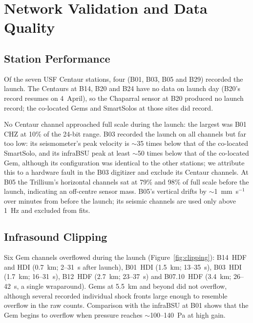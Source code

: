 \documentclass[]{seismica}
\begin{document}
\section{Network Validation and Data Quality}
\label{sec:observations}

\subsection{Station Performance}
\label{sec:quality}

Of the seven USF Centaur stations, four (B01, B03, B05 and B29) recorded
the launch. The Centaurs at B14, B20 and B24 have no data on launch day
(B20's record resumes on 4~April), so the Chaparral sensor at B20
produced no launch record; the co-located Gems and SmartSolos at those
sites did record.

No Centaur channel approached full scale during the launch: the
largest was B01 CHZ at 10\% of the 24-bit range. B03 recorded the launch
on all channels but far too low: its seismometer's peak velocity is
$\sim$35 times below that of the co-located SmartSolo, and its infraBSU
peak at least $\sim$50 times below that of the co-located Gem, although
its configuration was identical to the other stations; we attribute this to a hardware fault
in the B03 digitizer and exclude its Centaur channels. At B05 the
Trillium's horizontal channels sat at 79\% and 98\% of full scale
before the launch, indicating an off-centre sensor mass. B05's vertical
drifts by $\sim$1~mm~s$^{-1}$ over minutes from before the launch; its
seismic channels are used only above 1~Hz and excluded from fits.

\subsection{Infrasound Clipping}
\label{sec:clipping}

Six Gem channels overflowed during the launch
(Figure~\ref{fig:clipping}): B14~HDF and HDI (0.7~km; 2--31~s after
launch), B01~HDI (1.5~km; 13--35~s), B03~HDI (1.7~km; 16--31~s), B12~HDF
(2.7~km; 23--37~s) and B07.10~HDF (3.4~km; 26--42~s, a single
wraparound). Gems at 5.5~km and beyond did not overflow, although
several recorded individual shock fronts large enough to resemble
overflow in the raw counts. Comparison with the infraBSU at B01 shows
that the Gem begins to overflow when pressure reaches
$\sim$100--140~Pa at high gain.
\end{document}
